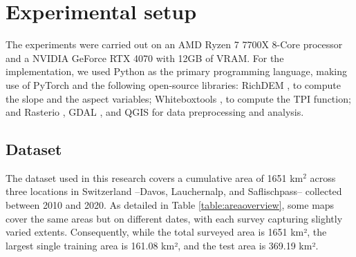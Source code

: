 \documentclass[preprint,12pt]{elsarticle}
\begin{document}
\section{Experimental setup} \label{Sec:ExperimentalSetup}

The experiments were carried out on an AMD Ryzen 7 7700X 8-Core processor and a NVIDIA GeForce RTX 4070 with 12GB of VRAM. For the implementation, we used Python as the primary programming language, making use of PyTorch \cite{collobert2011torch7} and the following open-source libraries: RichDEM \cite{RichDEM}, to compute the slope and the aspect variables; Whiteboxtools \cite{lindsay2014whitebox}, to compute the TPI function; and Rasterio \cite{Rasterio}, GDAL \cite{GDAL}, and QGIS \cite{QGISsoftware} for data preprocessing and analysis. 

\subsection{Dataset}

The dataset used in this research covers a cumulative area of 1651 km$^2$ across three locations in Switzerland --Davos, Lauchernalp, and Saflischpass-- collected between 2010 and 2020. As detailed in Table \ref{table:areaoverview}, some maps cover the same areas but on different dates, with each survey capturing slightly varied extents. Consequently, while the total surveyed area is 1651 km², the largest single training area is 161.08 km², and the test area is 369.19 km².
\end{document}
